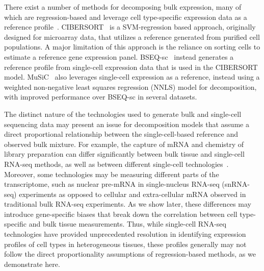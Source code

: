 There exist a number of methods for decomposing bulk expression, many of which are regression-based and leverage cell type-specific expression data as a reference profile~\cite{Mohammadi2017-rw}. CIBERSORT~\cite{Newman2015-iw} is a SVM-regression based approach, originally designed for microarray data, that utilizes a reference generated from purified cell populations. A major limitation of this approach is the reliance on sorting cells to estimate a reference gene expression panel. BSEQ-sc~\cite{Baron2016-hb} instead generates a reference profile from single-cell expression data that is used in the CIBERSORT model. MuSiC~\cite{Wang2019-lc} also leverages single-cell expression as a reference, instead using a weighted non-negative least squares regression (NNLS) model for decomposition, with improved performance over BSEQ-sc in several datasets.

The distinct nature of the technologies used to generate bulk and single-cell sequencing data may present an issue for decomposition models that assume a direct proportional relationship between the single-cell-based reference and observed bulk mixture. For example, the capture of mRNA and chemistry of library preparation can differ significantly between bulk tissue and single-cell RNA-seq methods, as well as between different single-cell technologies~\cite{Ziegenhain2017-ss,La_Manno2018-tx}. Moreover, some technologies may be measuring different parts of the transcriptome, such as nuclear pre-mRNA in single-nucleus RNA-seq (snRNA-seq) experiments as opposed to cellular and extra-cellular mRNA observed in traditional bulk RNA-seq experiments. As we show later, these differences may introduce gene-specific biases that break down the correlation between cell type-specific and bulk tissue measurements. Thus, while single-cell RNA-seq technologies have provided unprecedented resolution in identifying expression profiles of cell types in heterogeneous tissues, these profiles generally may not follow the direct proportionality assumptions of regression-based methods, as we demonstrate here.

